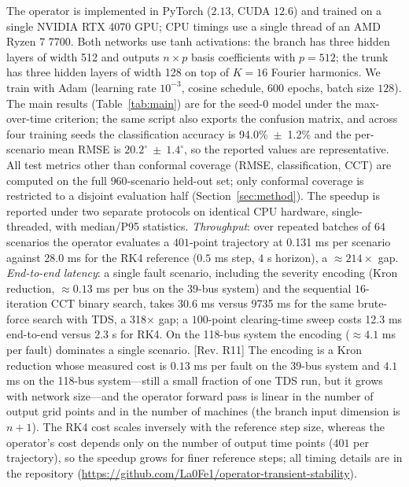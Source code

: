 \documentclass[5p,times]{elsarticle}
\newcommand{\accSeed}{94.0\%~$\pm$~1.2\%} %
\newcommand{\timCPU}{0.131}           %
\newcommand{\timRK}{28.0}             %
\newcommand{\timSU}{214}              %
\newcommand{\latEnd}{30.6}            %
\newcommand{\latRK}{9735}             %
\newcommand{\latSU}{318}              %
\newcommand{\latSweep}{12.3}          %
\begin{document}
The operator is implemented in PyTorch ($2.13$, CUDA $12.6$) and trained on a single NVIDIA RTX
4070 GPU; CPU timings use a single thread of an AMD Ryzen 7 7700. Both networks use tanh
activations: the branch has three hidden layers of width 512 and outputs $n\times p$ basis
coefficients with $p=512$; the trunk has three hidden layers of width 128 on top of $K=16$
Fourier harmonics. We train with Adam (learning rate $10^{-3}$, cosine schedule, $600$ epochs,
batch size $128$). The main results (Table~\ref{tab:main}) are for the seed-0 model under the
max-over-time criterion; the same script also exports the confusion matrix, and across four
training seeds the classification accuracy is \accSeed{} and the per-scenario mean RMSE is
$20.2^\circ~\pm~1.4^\circ$, so the reported values are representative. All test metrics other than
conformal coverage (RMSE, classification, CCT) are computed on the full $960$-scenario held-out
set; only conformal coverage is restricted to a disjoint evaluation half
(Section~\ref{sec:method}). The speedup is reported under two separate protocols on identical CPU hardware,
single-threaded, with median/P95 statistics.
\emph{Throughput}: over repeated batches of $64$ scenarios the operator evaluates a $401$-point
trajectory at \timCPU{} ms per scenario against \timRK{} ms for the RK4 reference ($0.5$ ms step,
$4$ s horizon), a $\approx\timSU{}\times$ gap. \emph{End-to-end latency}: a single fault
scenario, including the severity encoding (Kron reduction, $\approx0.13$ ms per bus on the 39-bus
system) and the sequential $16$-iteration CCT binary search, takes \latEnd{} ms versus
\latRK{} ms for the same brute-force search with TDS, a \latSU{}$\times$ gap; a $100$-point
clearing-time sweep costs \latSweep{} ms end-to-end versus $2.3$ s for RK4. On the 118-bus system
the encoding ($\approx4.1$ ms per fault) dominates a single scenario. [Rev. R11] The encoding is
a Kron reduction whose measured cost is $0.13$ ms per fault on the 39-bus system and $4.1$ ms on
the 118-bus system---still a small fraction of one TDS run, but it grows with network size---and
the operator forward pass is linear in the number of output grid points and in the number of
machines (the branch input dimension is $n+1$). The RK4 cost scales
inversely with the reference step size, whereas the operator's cost depends only on the number of
output time points ($401$ per trajectory), so the speedup grows for finer reference steps; all
timing details are in the repository (\url{https://github.com/La0Fe1/operator-transient-stability}).
\end{document}
